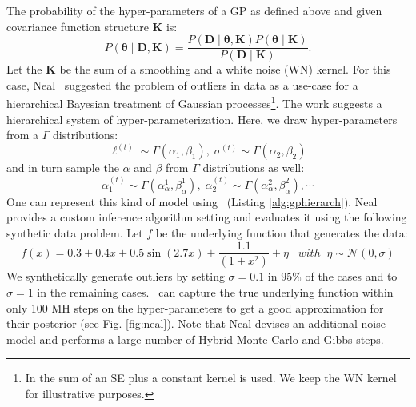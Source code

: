 The probability of the hyper-parameters of a GP as defined above and given covariance function structure $\mathbf{K}$ is:
\begin{equation}
\label{eq:hyperProbability}
P(\bm{\theta} \mid \mathbf{D,K}) = \frac{P(\mathbf{D} \mid \bm{\theta}, \mathbf{K})P(\bm{\theta} \mid  \mathbf{K})}{P(\mathbf{D} \mid \mathbf{K})}.
\end{equation}
Let the $\mathbf{K}$ be the sum of a smoothing and a white noise (WN) kernel. For this case, Neal~\citeyearpar{neal1997monte} suggested the problem of outliers in data as a use-case for a hierarchical Bayesian treatment of Gaussian processes\footnote{In \citep{neal1997monte} the sum of an SE plus a constant kernel is used. We keep the WN kernel for illustrative purposes.}. The work suggests a hierarchical system of hyper-parameterization. Here, we draw hyper-parameters from a $\Gamma$ distributions:
\begin{equation}
\label{eq:hyper-ell}
\ell^{(t)} \sim \Gamma(\alpha_1,\beta_1),\;\sigma^{(t)} \sim \Gamma(\alpha_2,\beta_2)
\end{equation} 
and in turn sample the $\alpha$ and $\beta$ from $\Gamma$ distributions as well:
\begin{equation}
\label{eq:hyper-alpha}
\alpha_1^{(t)} \sim \Gamma(\alpha^1_{\alpha},\beta^1_{ \alpha } ),\; \alpha_2^{(t)} \sim \Gamma(\alpha^2_{\alpha},\beta^2_{\alpha}),\cdots
\end{equation}
One can represent this kind of model using \gpmem\ (Listing \ref{alg:gphierarch}).
Neal provides a custom inference algorithm setting and evaluates it using the following synthetic data problem. Let $f$ be the underlying function that generates the data:
\begin{equation}
f(x) =  0.3 + 0.4 x + 0.5 \sin(2.7x) + \frac{1.1}{(1+ x^2)} + \eta \;\;\; with\;\;\eta \sim \mathcal{N}(0,\sigma)
\end{equation}
We synthetically generate outliers by setting $\sigma = 0.1$ in $95\%$ of the cases and to $\sigma = 1$ in the remaining cases. \gpmem\  can capture the true underlying function within only 100 MH steps on the hyper-parameters to get a good approximation for their posterior (see Fig. \ref{fig:neal}). Note that Neal devises an additional noise model and performs a large number of Hybrid-Monte Carlo and Gibbs steps.  
